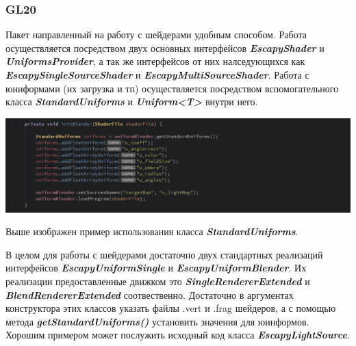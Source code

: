 \documentclass[11pt]{report}
\begin{document}
\subsubsection{GL20} 
Пакет направленный на работу с шейдерами удобным способом. Работа осуществляется посредством двух основных интерфейсов \textit{\textbf{EscapyShader}} и \textit{\textbf{UniformsProvider}}, а так же интерфейсов от них налседующихся как \textit{\textbf{EscapySingleSourceShader}} и \textit{\textbf{EscapyMultiSourceShader}}.
Работа с юниформами (их загрузка и тп) осуществляется посредством вспомогательного класса \textit{\textbf{StandardUniforms}} и \textit{\textbf{Uniform<T>}} внутри него. 
\begin{center}
	\includegraphics[width=1.2\linewidth]{img/9.png} 
  	\label{img:9} 
\end{center}
Выше изображен пример использования класса \textit{\textbf{StandardUniforms}}.

\newpage
В целом для работы с шейдерами достаточно двух стандартных реализаций интерфейсов
\textit{\textbf{EscapyUniformSingle}} и \textit{\textbf{EscapyUniformBlender}}. Их реализации предоставленные движком это \textit{\textbf{SingleRendererExtended}} и \textit{\textbf{BlendRendererExtended}} соотвественно. Достаточно в аргументах конструктора этих классов указать файлы .vert и .frag шейдеров, а с помощью метода 
\textit{\textbf{getStandardUniforms()}} установить значения для юинформов. Хорошим примером может послужить исходный код класса \textit{\textbf{EscapyLightSource}}.
\\
\end{document}
